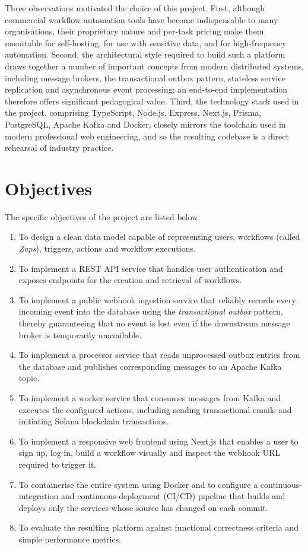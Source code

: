 Three observations motivated the choice of this project. First, although commercial workflow automation tools have become indispensable to many organisations, their proprietary nature and per-task pricing make them unsuitable for self-hosting, for use with sensitive data, and for high-frequency automation. Second, the architectural style required to build such a platform draws together a number of important concepts from modern distributed systems, including message brokers, the transactional outbox pattern, stateless service replication and asynchronous event processing; an end-to-end implementation therefore offers significant pedagogical value. Third, the technology stack used in the project, comprising TypeScript, Node.js, Express, Next.js, Prisma, PostgreSQL, Apache Kafka and Docker, closely mirrors the toolchain used in modern professional web engineering, and so the resulting codebase is a direct rehearsal of industry practice.

\section{Objectives}

The specific objectives of the project are listed below.

\begin{enumerate}[label=(\alph*)]
\item To design a clean data model capable of representing users, workflows (called \emph{Zaps}), triggers, actions and workflow executions.
\item To implement a REST API service that handles user authentication and exposes endpoints for the creation and retrieval of workflows.
\item To implement a public webhook ingestion service that reliably records every incoming event into the database using the \emph{transactional outbox} pattern, thereby guaranteeing that no event is lost even if the downstream message broker is temporarily unavailable.
\item To implement a processor service that reads unprocessed outbox entries from the database and publishes corresponding messages to an Apache Kafka topic.
\item To implement a worker service that consumes messages from Kafka and executes the configured actions, including sending transactional emails and initiating Solana blockchain transactions.
\item To implement a responsive web frontend using Next.js that enables a user to sign up, log in, build a workflow visually and inspect the webhook URL required to trigger it.
\item To containerise the entire system using Docker and to configure a continuous-integration and continuous-deployment (CI/CD) pipeline that builds and deploys only the services whose source has changed on each commit.
\item To evaluate the resulting platform against functional correctness criteria and simple performance metrics.
\end{enumerate}

